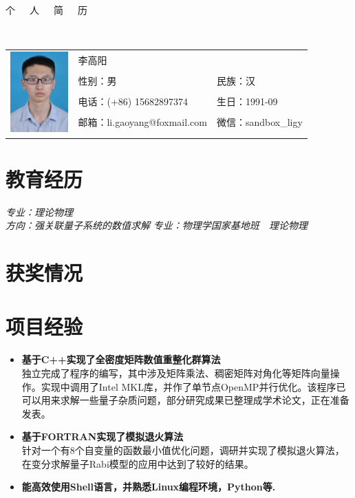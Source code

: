 \documentclass{resume}
\begin{document}

\begin{center}
\Huge{个~~~人~~~简~~~历}
\end{center}
\\
\Large{
  \begin{tabu}{ c l l }
    &
   \scshape{李高阳} &  \\
    & 性别：男 & 民族：汉 \\
    & 电话：(+86) 15682897374 & 生日：1991-09 \\
    & 邮箱：li.gaoyang@foxmail.com & 微信：sandbox\_ligy\\ \\
  \end{tabu}
}

\section{教育经历}
\textit{专业：理论物理}\\
\textit{方向：强关联量子系统的数值求解}
\textit{专业：物理学国家基地班\ \ 理论物理}

\section{获奖情况}

\section{项目经验}
\begin{itemize}%
\item \textbf{基于C++实现了全密度矩阵数值重整化群算法}\\
独立完成了程序的编写，其中涉及矩阵乘法、稠密矩阵对角化等矩阵向量操作。实现中调用了Intel MKL库，并作了单节点OpenMP并行优化。该程序已可以用来求解一些量子杂质问题，部分研究成果已整理成学术论文，正在准备发表。
\item \textbf{基于FORTRAN实现了模拟退火算法}\\
针对一个有8个自变量的函数最小值优化问题，调研并实现了模拟退火算法，在变分求解量子Rabi模型的应用中达到了较好的结果。
\item \textbf{能高效使用Shell语言，并熟悉Linux编程环境，Python等.}
\end{itemize}
\end{document}
